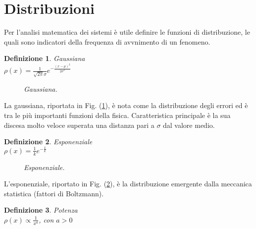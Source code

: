 \documentclass[12pt, a4paper]{book}
\theoremstyle{theorem}
\newtheorem{definition}{Definizione}[section]
\begin{document}
		\section{Distribuzioni}
		Per l'analisi matematica dei sistemi è utile definire le funzioni di distribuzione, le quali sono indicatori della frequenza di avvnimento di un fenomeno.
		\begin{definition}
			Gaussiana\\$\rho(x)=\frac{1}{\sqrt{2\pi}\sigma}e^{-\frac{(x-\mu)^2}{2\sigma^2}}$
		\end{definition}
		\begin{figure}[H]
			\centering
			\caption{\emph{Gaussiana.}}
			\label{figure:gaussiana}
		\end{figure}
		La gaussiana, riportata in Fig. (\ref{figure:gaussiana}), è nota come la distribuzione degli errori ed è tra le più importanti funzioni della fisica.
		Caratteristica principale è la sua discesa molto veloce superata una distanza pari a $\sigma$ dal valore medio.
		\begin{definition}
			Esponenziale\\$\rho(x)=\frac{1}{k}e^{-\frac{x}{k}}$
		\end{definition}
		\begin{figure}[H]
			\centering
			\caption{\emph{Esponenziale.}}
			\label{figure:esponenziale}
		\end{figure}
		L'esponenziale, riportato in Fig. (\ref{figure:esponenziale}), è la distribuzione emergente dalla meccanica statistica (fattori di Boltzmann).
		\begin{definition}
			Potenza\\$\rho(x)\propto\frac{1}{x^a}$, con $a>0$
		\end{definition}
\end{document}
